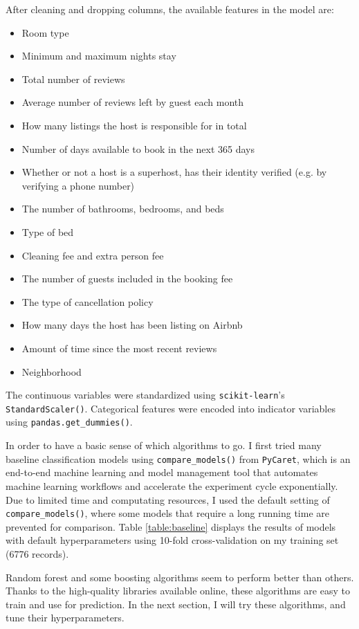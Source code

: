 \documentclass[11pt]{article}
\begin{document}
After cleaning and dropping columns, the available features in the model are:
\begin{itemize}
    \item Room type
    \item Minimum and maximum nights stay
    \item Total number of reviews
    \item Average number of reviews left by guest each month
    \item How many listings the host is responsible for in total 
    \item Number of days available to book in the next 365 days
    \item Whether or not a host is a superhost, has their identity verified (e.g. by verifying a phone number)
    \item The number of bathrooms, bedrooms, and beds
    \item Type of bed
    \item Cleaning fee and extra person fee
    \item The number of guests included in the booking fee
    \item The type of cancellation policy
    \item How many days the host has been listing on Airbnb
    \item Amount of time since the most recent reviews
    \item Neighborhood
\end{itemize}

The continuous variables were standardized using \texttt{scikit-learn}’s \texttt{StandardScaler()}. Categorical features were encoded into indicator variables using \texttt{pandas.get\_dummies()}. 

In order to have a basic sense of which algorithms to go. I first tried many baseline classification models using \texttt{compare\_models()} from \texttt{PyCaret}\cite{PyCaret}, which is an end-to-end machine learning and model management tool that automates machine learning workflows and accelerate the experiment cycle exponentially. Due to limited time and computating resources, I used the default setting of \texttt{compare\_models()}, where some models that require a long running time are prevented for comparison. Table \ref{table:baseline} displays the results of models with default hyperparameters using 10-fold cross-validation on my training set (6776 records).

Random forest and some boosting algorithms seem to perform better than others. Thanks to the high-quality libraries available online, these algorithms are easy to train and use for prediction. In the next section, I will try these algorithms, and tune their hyperparameters. 
\end{document}
